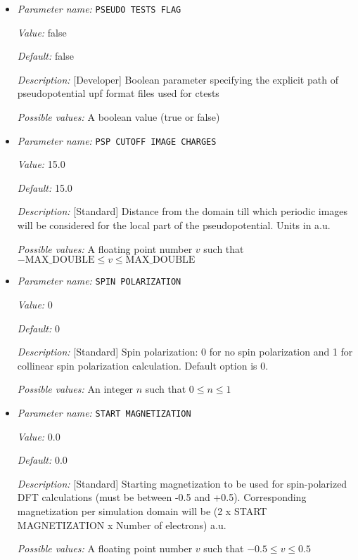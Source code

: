 \begin{itemize}
{\it Possible values:} Any string
\item {\it Parameter name:} {\tt PSEUDO TESTS FLAG}
\label{parameters:DFT functional parameters/PSEUDO TESTS FLAG}
\label{parameters:DFT_20functional_20parameters/PSEUDO_20TESTS_20FLAG}


{\it Value:} false


{\it Default:} false


{\it Description:} [Developer] Boolean parameter specifying the explicit path of pseudopotential upf format files used for ctests


{\it Possible values:} A boolean value (true or false)
\item {\it Parameter name:} {\tt PSP CUTOFF IMAGE CHARGES}
\label{parameters:DFT functional parameters/PSP CUTOFF IMAGE CHARGES}
\label{parameters:DFT_20functional_20parameters/PSP_20CUTOFF_20IMAGE_20CHARGES}


{\it Value:} 15.0


{\it Default:} 15.0


{\it Description:} [Standard] Distance from the domain till which periodic images will be considered for the local part of the pseudopotential. Units in a.u. 


{\it Possible values:} A floating point number $v$ such that $-\text{MAX\_DOUBLE} \leq v \leq \text{MAX\_DOUBLE}$
\item {\it Parameter name:} {\tt SPIN POLARIZATION}
\label{parameters:DFT functional parameters/SPIN POLARIZATION}
\label{parameters:DFT_20functional_20parameters/SPIN_20POLARIZATION}


{\it Value:} 0


{\it Default:} 0


{\it Description:} [Standard] Spin polarization: 0 for no spin polarization and 1 for collinear spin polarization calculation. Default option is 0.


{\it Possible values:} An integer $n$ such that $0\leq n \leq 1$
\item {\it Parameter name:} {\tt START MAGNETIZATION}
\label{parameters:DFT functional parameters/START MAGNETIZATION}
\label{parameters:DFT_20functional_20parameters/START_20MAGNETIZATION}


{\it Value:} 0.0


{\it Default:} 0.0


{\it Description:} [Standard] Starting magnetization to be used for spin-polarized DFT calculations (must be between -0.5 and +0.5). Corresponding magnetization per simulation domain will be (2 x START MAGNETIZATION x Number of electrons) a.u. 


{\it Possible values:} A floating point number $v$ such that $-0.5 \leq v \leq 0.5$
\end{itemize}
